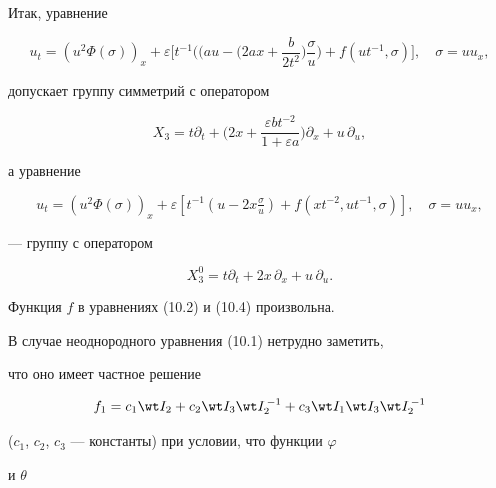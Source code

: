  


Итак, уравнение 


\begin{equation} 


u_t=(u^2\Phi(\sigma))_x+\varepsilon\bigg[t^{-1}\bigg((a u-\bigg( 


2ax+\frac{b}{2t^2}\bigg)\frac{\sigma}{u}\bigg)+ 


f(u t^{-1},\sigma)\bigg],\quad \sigma=u u_x, \tag{10.2} 


\end{equation} 


допускает группу симметрий с оператором 


\begin{equation} 


X_3=t\partial _t+\bigg(2x+\frac{\varepsilon b t^{-2}} 


{1+\varepsilon a}\bigg)\partial _x+u\,\partial _u,\tag{10.3} 


\end{equation} 


а уравнение 


\begin{equation} 


u_t=(u^2\Phi(\sigma))_x+\varepsilon[t^{-1}(u-2x 


\tfrac{\sigma}{u})+f(x t^{-2},u t^{-1},\sigma)],\quad 


\sigma=u u_x, \tag{10.4} 


\end{equation} 


--- группу с оператором 


$$ 


X^0_3=t \partial _t+2x\,\partial _x+u\,\partial _u. 


$$ 


Функция $f$ в уравнениях (10.2) и (10.4) произвольна.


 


В случае неоднородного уравнения (10.1) нетрудно заметить, 


что оно имеет частное решение 


$$ 


f_1=c_1\wt I_2+c_2\wt I_3\wt I^{\,-1}_2+ 


c_3\wt I_1\wt I_3\wt I^{\,-1}_2 


$$ 


($c_1$, $c_2$, $c_3$ --- константы) при условии, что функции $\varphi$ 


и $\theta$ 


